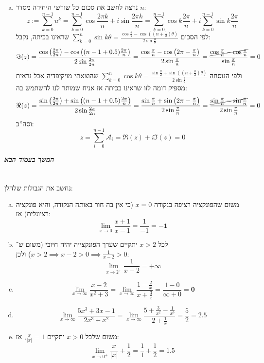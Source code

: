 \documentclass[]{article}
\newcommand\npage {\vfil {\hfil \textbf{\textit{המשך בעמוד הבא}}} \hfil \vfil}
\newcommand\ac    {\mathcal{A}}
\newcommand\limz  {\lim_{x \to 0}}
\newcommand\limi  {\lim_{x \to \infty}}
\newcommand\ta    {\theta}
\renewcommand\inf {\infty}
\newcommand\cl [1]    {\left ( #1 \right )}
\begin{document}
\begin{enumerate}[(a)]
\begin{proof}
		\end{proof}
		\item נרצה לחשב את סכום כל שורשי היחידה מסדר $n$:
		\[ z := \sum_{k = 0}^{n - 1}u^{k} = \sum_{k = 0}^{n - 1}\cos \frac{2\pi k}{n} + i \sin \frac{2\pi k}{n} = \sum_{k = 0}^{n - 1} \cos k \frac{2\pi}{n} + i\sum_{k = 0}^{n - 1}\sin k \frac{2\pi}{n} \]
		לפי הסכום $\sum_{k = 0}^{n} \sin k \ta = \frac{\cos \frac{\ta}{2} - \cos \left ((n + \frac{1}{2})\ta \right )}{2 \sin \frac{\ta}{2}}$ שראינו בכיתה, נקבל: 
		\[ \Im(z) = \frac{\cos \left (\frac{2\pi}{2n}\right ) - \cos \cl{(n - 1 + 0.5)\frac{2\pi}{n}}}{2 \sin \frac{2\pi}{2n}}
		          = \frac{\cos \frac{\pi}{n} - \cos \cl{2\pi - \frac{\pi}{n}}}{2 \sin \frac{\pi}{n}}
		          = \frac{\cancel{\cos \frac{\pi}{n} - \cos \frac{\pi}{n}}}{\sin \frac{\pi}{n}}
		          = 0 \]
		ולפי הנוסחה $\sum_{k=0}^n \cos k\theta = \frac{\sin \frac\ta2 + \sin\left(\left(n + \frac\ta2\right)\theta\right)}{2\sin\frac\ta2}$ שהוצאתי מויקיפדיה אבל נראית מספיק דומה לזו שראינו בכיתה אז אניח שמותר לנו להשתמש בה: 
		\[ \Re(z) = \frac{\sin \left (\frac{2\pi}{2n}\right ) + \sin \cl{(n - 1 + 0.5)\frac{2\pi}{n}}}{2 \sin \frac{2\pi}{2n}}
		          = \frac{\sin \frac{\pi}{n} + \sin \cl{2\pi - \frac{\pi}{n}}}{2 \sin \frac{\pi}{n}}
		          = \frac{\cancel{\sin \frac{\pi}{n} - \sin \frac{\pi}{n}}}{2\sin \frac{\pi}{n}}
		          = 0 \]
		וסה''כ: 
		\[ z = \sum_{i = 0}^{n - 1} \ac_i = \Re(z) + i\Im(z) = 0 \]
	\end{enumerate}
	
	\npage 
	
	\pagebreak
	\section{} %
	נחשב את הגבולות שלהלן: 
	\begin{enumerate}[(a)]
		\item משום שהפונקציה רציפה בנקודה $x = 0$ (כי אין בה חור באותה הנקודה, והיא פונקציה רציונלית) אז: 
		\[ \limz \frac{x + 1}{x - 1} = \frac{1}{-1} = \bm{-1} \]
		\item לכל $x > 2$ יתקיים שערך הפונקצייה יהיה חיובי (משום ש־$x > 2 \implies x - 2 > 0 \implies \frac{1}{x - 2} > 0$) ולכן: 
		\[ \lim_{x \to 2^+} \frac{1}{x - 2} = \bm{+\inf} \]
		\item 
		\[ \limi \frac{x - 2}{x^2 + 3} = \limi \frac{1 - \frac{2}{x}}{x + \frac{3}{x}} = \frac{1 - 0}{\inf + 0} = \bm{0} \]
		\item 
		\[ \limi \frac{5x^3 + 3x - 1}{2x^3 + x^2} = \limi \frac{5 + \frac{3}{x^2} - \frac{1}{x^3}}{2 + \frac{1}{x}} = \frac{5}{2} = \bm{2.5} \]
		\item משום שלכל $x > 0$ יתקיים $\frac{x}{|x|} = 1$, אז: 
		\[ \lim_{x \to 0^+} \frac{x}{|x|} + \frac{1}{2} = \frac{1}{1} + \frac{1}{2} = \bm{1.5} \]
	\end{enumerate}
\end{document}
